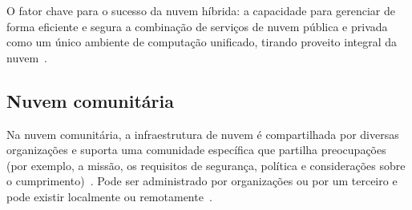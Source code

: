 O fator chave para o sucesso da nuvem híbrida: a capacidade para gerenciar de
forma eficiente e segura a combinação de serviços de nuvem pública e privada
como um único ambiente de computação unificado, tirando proveito integral da
nuvem~\cite{ibm-what-is-cloud-computing}.

\subsection{Nuvem comunitária}

Na nuvem comunitária, a infraestrutura de nuvem é compartilhada por diversas
organizações e suporta uma comunidade específica que partilha preocupações
(por exemplo, a missão, os requisitos de segurança, política e considerações sobre
o cumprimento)~\cite{brown2014seguranca}. Pode ser administrado por organizações
ou por um terceiro e pode existir localmente ou remotamente~\cite{brown2014seguranca}.

